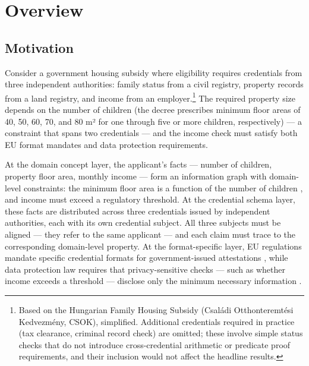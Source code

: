 

\section{Overview}\label{overview}

\label{sec:overview}

\subsection{Motivation}\label{motivation}

\label{sec:motivation}

Consider a government housing subsidy where eligibility requires credentials from three independent authorities: family status from a civil registry, property records from a land registry, and income from an employer.\footnote{Based on the Hungarian Family Housing Subsidy (Családi Otthonteremtési Kedvezmény, CSOK), simplified. Additional credentials required in practice (tax clearance, criminal record check) are omitted; these involve simple status checks that do not introduce cross-credential arithmetic or predicate proof requirements, and their inclusion would not affect the headline results.} The required property size depends on the number of children \citep{noauthor_5182023_nodate} (the decree prescribes minimum floor areas of 40, 50, 60, 70, and 80 m² for one through five or more children, respectively) --- a constraint that spans two credentials --- and the income check must satisfy both EU format mandates and data protection requirements.

At the domain concept layer, the applicant's facts --- number of children, property floor area, monthly income --- form an information graph with domain-level constraints: the minimum floor area is a function of the number of children \citep{noauthor_5182023_nodate}, and income must exceed a regulatory threshold. At the credential schema layer, these facts are distributed across three credentials issued by independent authorities, each with its own credential subject. All three subjects must be aligned --- they refer to the same applicant --- and each claim must trace to the corresponding domain-level property. At the format-specific layer, EU regulations mandate specific credential formats for government-issued attestations \citep{noauthor_eu-digital-identity-walleteudi-doc-architecture-and-reference-framework_2026}, while data protection law requires that privacy-sensitive checks --- such as whether income exceeds a threshold --- disclose only the minimum necessary information \citep{gdpr} \citep{noauthor_naih_nodate}.

